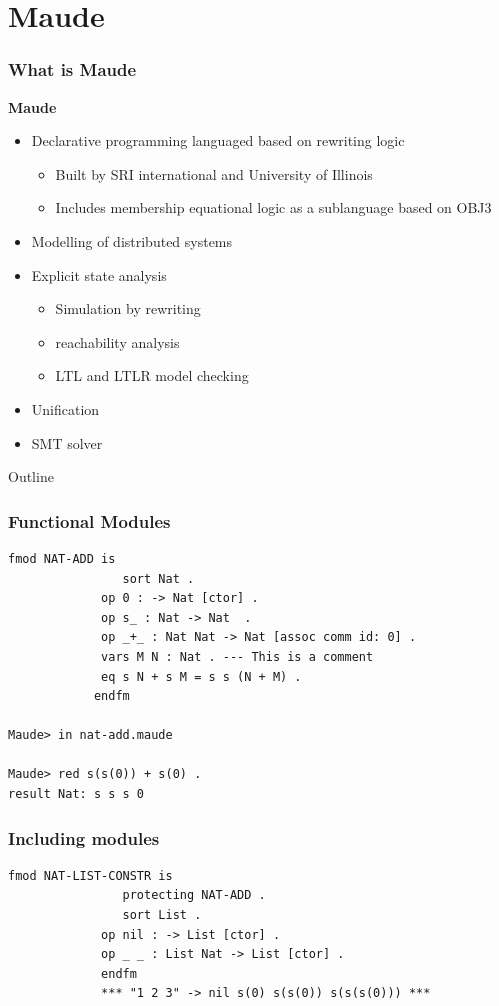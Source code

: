 \documentclass{beamer}
\begin{document}
\section{Maude}
\begin{frame}
    \frametitle{What is Maude}
    \textbf{Maude}
    \begin{itemize}
        \pause
        \item Declarative programming languaged based on rewriting logic 
        \begin{itemize}
            \item Built by SRI international and University of Illinois
            \item Includes membership equational logic as a sublanguage based on OBJ3 
        \end{itemize}
        \pause
        \item Modelling of distributed systems 
        \pause 
        \item  Explicit state analysis 
        \begin{itemize}
            \item Simulation by rewriting 
            \item reachability analysis 
            \item LTL and LTLR model checking 
        \end{itemize}
        \pause 
        
        \item Unification 
        \item SMT solver
    \end{itemize}
\end{frame}
\begin{frame}{Outline}
\end{frame}
\begin{frame}[fragile]
    \frametitle{Functional Modules}
    \begin{lstlisting}[language=maude]
            fmod NAT-ADD is
                sort Nat .
             op 0 : -> Nat [ctor] .
             op s_ : Nat -> Nat  .
             op _+_ : Nat Nat -> Nat [assoc comm id: 0] .
             vars M N : Nat . --- This is a comment
             eq s N + s M = s s (N + M) .
            endfm

Maude> in nat-add.maude 

Maude> red s(s(0)) + s(0) .
result Nat: s s s 0

    \end{lstlisting}
\end{frame}
    \begin{frame}[fragile]
        \frametitle{Including modules}
        \begin{lstlisting}[language=maude]
            fmod NAT-LIST-CONSTR is
                protecting NAT-ADD .
                sort List .
             op nil : -> List [ctor] .
             op _ _ : List Nat -> List [ctor] .
             endfm
             *** "1 2 3" -> nil s(0) s(s(0)) s(s(s(0))) ***
        \end{lstlisting}
        
    \end{frame}
\end{document}

